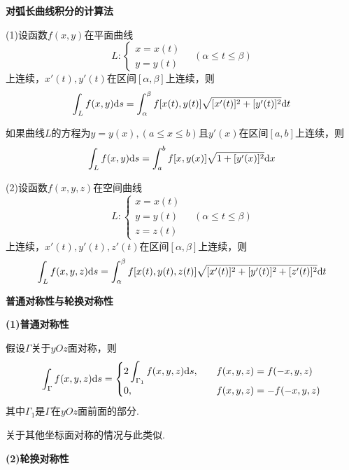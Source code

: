 \textbf{对弧长曲线积分的计算法}

(1)设函数$f(x,y)$在平面曲线
\begin{equation*}
    L:
    \begin{cases}
        x=x(t) \\
        y=y(t)
    \end{cases}
    \quad (\alpha\leq t\leq \beta)
\end{equation*}
上连续，$x'(t),y'(t)$在区间$[\alpha,\beta]$上连续，则
\begin{equation*}
    \int_{L}f(x,y)\mathrm{d} s=\int_{\alpha}^{\beta}f[x(t),y(t)]\sqrt{[x'(t)]^{2}+[y'(t)]^{2}}\mathrm{d} t
\end{equation*}

如果曲线$L$的方程为$y=y(x),(a\leq x\leq b)$且$y'(x)$在区间$[a,b]$上连续，则
\begin{equation*}
    \int_{L}f(x,y)\mathrm{d} s=\int_{a}^{b}f[x,y(x)]\sqrt{1+[y'(x)]^{2}}\mathrm{d} x
\end{equation*}

(2)设函数$f(x,y,z)$在空间曲线
\begin{equation*}
    L:
    \begin{cases}
        x=x(t) \\
        y=y(t) \\
        z=z(t)
    \end{cases}
    \quad (\alpha\leq t\leq \beta)
\end{equation*}
上连续，$x'(t),y'(t),z'(t)$在区间$[\alpha,\beta]$上连续，则
\begin{equation*}
    \int_{L}f(x,y,z)\mathrm{d} s=\int_{\alpha}^{\beta}f[x(t),y(t),z(t)]\sqrt{[x'(t)]^{2}+[y'(t)]^{2}+[z'(t)]^{2}}\mathrm{d} t
\end{equation*}

\textbf{普通对称性与轮换对称性}

\textbf{(1)普通对称性}

假设$\Gamma$关于$yOz$面对称，则
\begin{equation*}
    \int_{\Gamma}f(x,y,z)\mathrm{d} s=
    \begin{cases}
        2\displaystyle\int_{\Gamma_1}f(x,y,z)\mathrm{d} s, \quad & f(x,y,z)=f(-x,y,z) \\
        0, \quad & f(x,y,z)=-f(-x,y,z)
    \end{cases}
\end{equation*}
其中$\Gamma_1$是$\Gamma$在$yOz$面前面的部分.

关于其他坐标面对称的情况与此类似.

\textbf{(2)轮换对称性}


